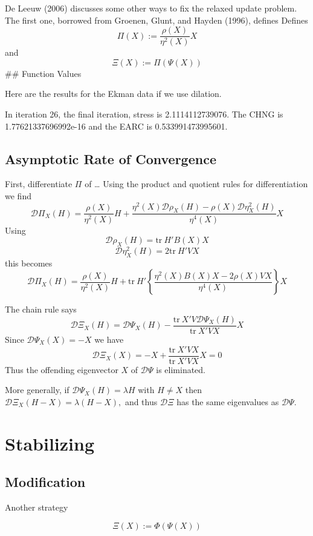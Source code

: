\documentclass[
  12pt,
]{article}
\begin{document}
De Leeuw (2006) discusses some other ways to fix the relaxed update problem.
The first one, borrowed from Groenen, Glunt, and Hayden (1996), defines
Defines
\[
\Pi(X):=\frac{\rho(X)}{\eta^2(X)}X
\]
and
\[
\Xi(X):=\Pi(\Psi(X))
\]
\#\# Function Values

Here are the results for the Ekman data if we use dilation.

In iteration 26, the final iteration, stress is 2.1114112739076. The CHNG is 1.77621337696992e-16 and the EARC is 0.533991473995601.

\subsection{Asymptotic Rate of Convergence}\label{asymptotic-rate-of-convergence-6}

First, differentiate \(\Pi\) of \ldots{} Using the product and quotient rules for differentiation we find
\[
\mathcal{D}\Pi_X(H)=\frac{\rho(X)}{\eta^2(X)}H+\frac{\eta^2(X)\mathcal{D}\rho_X(H)-\rho(X)\mathcal{D}\eta^2_X(H)}{\eta^4(X)}X
\]
Using
\[
\mathcal{D}\rho_X(H)=\text{tr}\ H'B(X)X
\]
\[
\mathcal{D}\eta^2_X(H)=2\text{tr}\ H'VX
\]
this becomes
\[
\mathcal{D}\Pi_X(H)=\frac{\rho(X)}{\eta^2(X)}H+\text{tr}\ H'\left\{\frac{\eta^2(X) B(X)X-2\rho(X)VX}{\eta^4(X)}\right\}X
\]

The chain rule says
\[
\mathcal{D}\Xi_X(H)=\mathcal{D}\Psi_X(H)-\frac{\text{tr}\ X'V\mathcal{D}\Psi_X(H)}{\text{tr}\ X'VX}X
\]
Since \(\mathcal{D}\Psi_X(X)=-X\) we have
\[
\mathcal{D}\Xi_X(X)=-X+\frac{\text{tr}\ X'VX}{\text{tr}\ X'VX}X=0
\]
Thus the offending eigenvector \(X\) of \(\mathcal{D}\Psi\) is eliminated.

More generally, if \(\mathcal{D}\Psi_X(H)=\lambda H\) with \(H\not= X\) then
\(\mathcal{D}\Xi_X(H-X)=\lambda (H-X),\)
and thus \(\mathcal{D}\Xi\) has the same eigenvalues as \(\mathcal{D}\Psi\).

\section{Stabilizing}\label{stabilizing}

\subsection{Modification}\label{modification-6}

Another strategy

\begin{equation}
\Xi(X):=\Phi(\Psi(X))
\end{equation}
\end{document}
